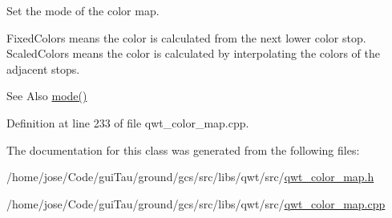 Set the mode of the color map. 

Fixed\-Colors means the color is calculated from the next lower color stop. Scaled\-Colors means the color is calculated by interpolating the colors of the adjacent stops.

\begin{DoxySeeAlso}{See Also}
\hyperlink{class_qwt_linear_color_map_a9ec309df6ec88472a63b14ac2c692c96}{mode()} 
\end{DoxySeeAlso}


Definition at line 233 of file qwt\-\_\-color\-\_\-map.\-cpp.



The documentation for this class was generated from the following files\-:\begin{DoxyCompactItemize}
\item 
/home/jose/\-Code/gui\-Tau/ground/gcs/src/libs/qwt/src/\hyperlink{qwt__color__map_8h}{qwt\-\_\-color\-\_\-map.\-h}\item 
/home/jose/\-Code/gui\-Tau/ground/gcs/src/libs/qwt/src/\hyperlink{qwt__color__map_8cpp}{qwt\-\_\-color\-\_\-map.\-cpp}\end{DoxyCompactItemize}
